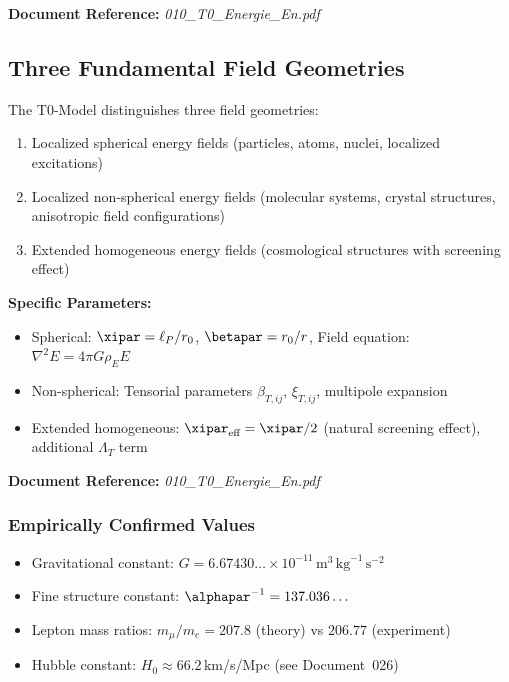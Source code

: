 \textbf{Document Reference:} \textit{010\_T0\_Energie\_En.pdf}

\subsection{Three Fundamental Field Geometries}

The T0-Model distinguishes three field geometries:

\begin{enumerate}
	\item Localized spherical energy fields (particles, atoms, nuclei, localized excitations)
	\item Localized non-spherical energy fields (molecular systems, crystal structures, anisotropic field configurations)
	\item Extended homogeneous energy fields (cosmological structures with screening effect)
\end{enumerate}

\textbf{Specific Parameters:}
\begin{itemize}
	\item Spherical: $\xipar = \ell_P/r_0$, $\betapar = r_0/r$, Field equation: $\nabla^2 E = 4\pi G \rho_E E$
	\item Non-spherical: Tensorial parameters $\beta_{T,ij}$, $\xi_{T,ij}$, multipole expansion
	\item Extended homogeneous: $\xipar_{\text{eff}} = \xipar/2$ (natural screening effect), additional $\Lambda_T$ term
\end{itemize}

\textbf{Document Reference:} \textit{010\_T0\_Energie\_En.pdf}

\subsubsection{Empirically Confirmed Values}

\begin{itemize}
	\item Gravitational constant: $G = 6.67430\ldots \times 10^{-11} \, \text{m}^3 \, \text{kg}^{-1} \, \text{s}^{-2}$ \checkmark
	\item Fine structure constant: $\alphapar^{-1} = 137.036\ldots$ \checkmark
	\item Lepton mass ratios: $m_\mu/m_e = 207.8$ (theory) vs $206.77$ (experiment) \checkmark
	\item Hubble constant: $H_0 \approx 66.2\,$km/s/Mpc (see Document~026) \checkmark
\end{itemize}

